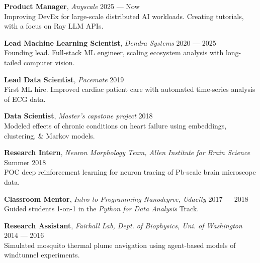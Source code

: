 \documentclass[a4paper,12pt]{article}
\newcommand{\ressubheading}[4]{
    \textbf{#1} \hfill #2\\
    \textit{#3} \hfill #4 \\}
\begin{document}
    {\setlength{\parskip}{8pt}

    \textbf{Product Manager}, \textit{Anyscale} \hfill 2025 --- Now \\
    Improving DevEx for large-scale distributed AI workloads. Creating tutorials, with a focus on Ray LLM APIs.

    \textbf{Lead Machine Learning Scientist}, \textit{Dendra Systems} \hfill 2020 --- 2025 \\
    Founding lead. Full-stack ML engineer, scaling ecosystem analysis with long-tailed computer vision.


    \textbf{Lead Data Scientist}, \textit{Pacemate} \hfill 2019 \\
    First ML hire. Improved cardiac patient care with automated time-series analysis of ECG data.

    \textbf{Data Scientist}, \textit{Master's capstone project} \hfill 2018\\
    Modeled effects of chronic conditions on heart failure using embeddings, clustering, \& Markov models.

    \textbf{Research Intern}, \textit{Neuron Morphology Team, Allen Institute for Brain Science} \hfill Summer 2018\\
    POC deep reinforcement learning for neuron tracing of Pb-scale brain microscope data.


    \textbf{Classroom Mentor}, \textit{Intro to Programming Nanodegree, Udacity} \hfill 2017 --- 2018\\
    Guided students 1-on-1 in the \textit{Python for Data Analysis} Track.

    \textbf{Research Assistant}, \textit{Fairhall Lab, Dept. of Biophysics, Uni. of Washington} \hfill 2014 --- 2016\\
    Simulated mosquito thermal plume navigation using agent-based models of windtunnel experiments.\\


    }
\end{document}
